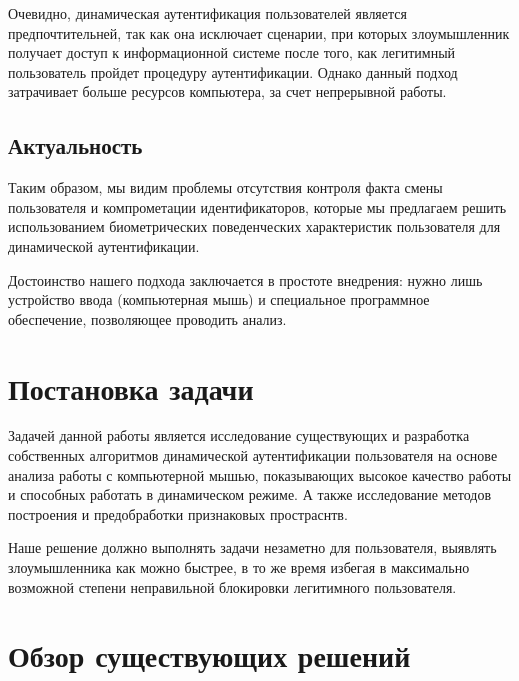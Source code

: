 \documentclass[12pt]{article}
\begin{document}
    \par Очевидно, динамическая аутентификация пользователей является предпочтительней, так как она исключает сценарии, при которых злоумышленник получает доступ к информационной системе после того, как легитимный пользователь пройдет процедуру аутентификации. Однако данный подход затрачивает больше ресурсов компьютера, за счет непрерывной работы.


    \subsection{Актуальность}
    \label{sec:Intro:Relevance}

    \par Таким образом, мы видим проблемы отсутствия контроля факта смены пользователя и компрометации идентификаторов, которые мы предлагаем решить использованием биометрических поведенческих характеристик пользователя для динамической аутентификации.

    \par Достоинство нашего подхода заключается в простоте внедрения: нужно лишь устройство ввода (компьютерная мышь) и специальное программное обеспечение, позволяющее проводить анализ.

    \newpage



    \section{Постановка задачи}
    \label{sec:FormulationOfProblem}

    \par Задачей данной работы является исследование существующих и разработка собственных алгоритмов динамической аутентификации пользователя на основе анализа работы с компьютерной мышью, показывающих высокое качество работы и способных работать в динамическом режиме. А также исследование методов построения и предобработки признаковых простраснтв.

    \par Наше решение должно выполнять задачи незаметно для пользователя, выявлять злоумышленника как можно быстрее, в то же время избегая в максимально возможной степени неправильной блокировки легитимного пользователя.

    \newpage



    \section{Обзор существующих решений}
    \label{sec:Overview}
\end{document}
